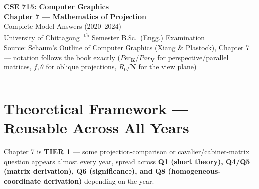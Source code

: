 \documentclass[12pt, a4paper]{article}
\begin{document}

\begin{center}
  {\LARGE\bfseries\color{sectionblue} CSE 715: Computer Graphics}\\[0.6em]
  {\Large\bfseries Chapter 7 --- Mathematics of Projection}\\[0.3em]
  {\large Complete Model Answers (2020--2024)}\\[0.2em]
  {\normalsize University of Chittagong \quad|\textsuperscript{th} Semester B.Sc.\ (Engg.) Examination}\\[0.3em]
  {\small Source: Schaum's Outline of Computer Graphics (Xiang \& Plastock), Chapter 7 --- notation follows the book exactly ($Per_{\mathbf K}$/$Par_{\mathbf V}$ for perspective/parallel matrices, $f,\theta$ for oblique projections, $R_0$/$\mathbf N$ for the view plane)}
\end{center}

\vspace{0.3em}
\noindent\rule{\linewidth}{1pt}
\vspace{0.5em}

\tableofcontents
\newpage

\section{Theoretical Framework --- Reusable Across All Years}
Chapter 7 is \textbf{TIER 1} --- some projection-comparison or cavalier/cabinet-matrix question appears almost every year, spread across \textbf{Q1 (short theory), Q4/Q5 (matrix derivation), Q6 (significance), and Q8 (homogeneous-coordinate derivation)} depending on the year.

\end{document}

